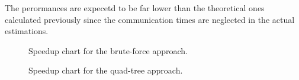 The perormances are expecetd to be far lower than the theoretical ones calculated previously since the communication times are neglected in the actual estimations. 
\begin{figure}

\caption{Speedup chart for the brute-force approach.}
\end{figure}

\begin{figure}

\caption{Speedup chart for the quad-tree approach.}
\end{figure}
